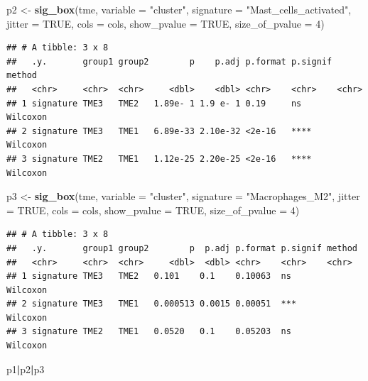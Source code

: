 \documentclass[
  12pt,
]{book}
\newenvironment{Shaded}{\begin{snugshade}}{\end{snugshade}}
\newcommand{\AttributeTok}[1]{\textcolor[rgb]{0.13,0.29,0.53}{#1}}
\newcommand{\ConstantTok}[1]{\textcolor[rgb]{0.56,0.35,0.01}{#1}}
\newcommand{\DecValTok}[1]{\textcolor[rgb]{0.00,0.00,0.81}{#1}}
\newcommand{\FunctionTok}[1]{\textcolor[rgb]{0.13,0.29,0.53}{\textbf{#1}}}
\newcommand{\NormalTok}[1]{#1}
\newcommand{\OtherTok}[1]{\textcolor[rgb]{0.56,0.35,0.01}{#1}}
\newcommand{\SpecialCharTok}[1]{\textcolor[rgb]{0.81,0.36,0.00}{\textbf{#1}}}
\newcommand{\StringTok}[1]{\textcolor[rgb]{0.31,0.60,0.02}{#1}}
\begin{document}
\begin{Shaded}
\begin{Highlighting}[]
\NormalTok{p2 }\OtherTok{\textless{}{-}} \FunctionTok{sig\_box}\NormalTok{(tme, }\AttributeTok{variable =} \StringTok{"cluster"}\NormalTok{, }\AttributeTok{signature =} \StringTok{"Mast\_cells\_activated"}\NormalTok{, }
              \AttributeTok{jitter =} \ConstantTok{TRUE}\NormalTok{, }\AttributeTok{cols =}\NormalTok{  cols, }\AttributeTok{show\_pvalue =} \ConstantTok{TRUE}\NormalTok{, }\AttributeTok{size\_of\_pvalue =} \DecValTok{4}\NormalTok{)}
\end{Highlighting}
\end{Shaded}

\begin{verbatim}
## # A tibble: 3 x 8
##   .y.       group1 group2        p    p.adj p.format p.signif method  
##   <chr>     <chr>  <chr>     <dbl>    <dbl> <chr>    <chr>    <chr>   
## 1 signature TME3   TME2   1.89e- 1 1.9 e- 1 0.19     ns       Wilcoxon
## 2 signature TME3   TME1   6.89e-33 2.10e-32 <2e-16   ****     Wilcoxon
## 3 signature TME2   TME1   1.12e-25 2.20e-25 <2e-16   ****     Wilcoxon
\end{verbatim}

\begin{Shaded}
\begin{Highlighting}[]
\NormalTok{p3 }\OtherTok{\textless{}{-}} \FunctionTok{sig\_box}\NormalTok{(tme, }\AttributeTok{variable =} \StringTok{"cluster"}\NormalTok{, }\AttributeTok{signature =} \StringTok{"Macrophages\_M2"}\NormalTok{, }
              \AttributeTok{jitter =} \ConstantTok{TRUE}\NormalTok{, }\AttributeTok{cols =}\NormalTok{  cols, }\AttributeTok{show\_pvalue =} \ConstantTok{TRUE}\NormalTok{, }\AttributeTok{size\_of\_pvalue =} \DecValTok{4}\NormalTok{)}
\end{Highlighting}
\end{Shaded}

\begin{verbatim}
## # A tibble: 3 x 8
##   .y.       group1 group2        p  p.adj p.format p.signif method  
##   <chr>     <chr>  <chr>     <dbl>  <dbl> <chr>    <chr>    <chr>   
## 1 signature TME3   TME2   0.101    0.1    0.10063  ns       Wilcoxon
## 2 signature TME3   TME1   0.000513 0.0015 0.00051  ***      Wilcoxon
## 3 signature TME2   TME1   0.0520   0.1    0.05203  ns       Wilcoxon
\end{verbatim}

\begin{Shaded}
\begin{Highlighting}[]
\NormalTok{p1}\SpecialCharTok{|}\NormalTok{p2}\SpecialCharTok{|}\NormalTok{p3}
\end{Highlighting}
\end{Shaded}
\end{document}
